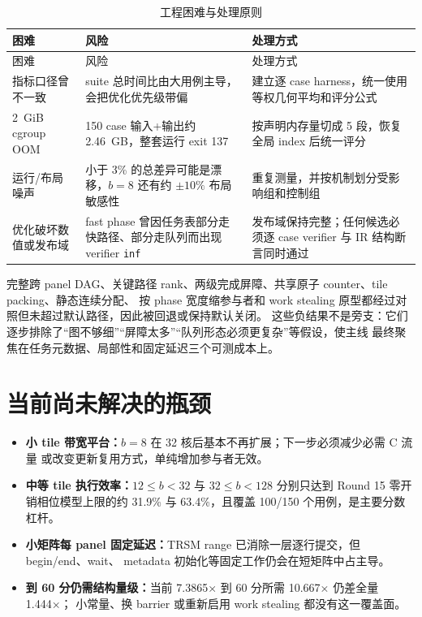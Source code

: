 \documentclass[UTF8,a4paper,openany,11pt,fontset=fandol]{ctexrep}
\begin{document}
\begin{longtable}{L{3.3cm}L{5.0cm}L{5.4cm}}
  \caption{工程困难与处理原则}\label{tab:difficulties}\\
  \toprule
  困难 & 风险 & 处理方式 \\
  \midrule
  \endfirsthead
  \toprule
  困难 & 风险 & 处理方式 \\
  \midrule
  \endhead
  指标口径曾不一致 & suite 总时间比由大用例主导，会把优化优先级带偏 &
  建立逐 case harness，统一使用等权几何平均和评分公式 \\
  2~GiB cgroup OOM & 150 case 输入+输出约 2.46~GB，整套运行 exit 137 &
  按声明内存量切成 5 段，恢复全局 index 后统一评分 \\
  运行/布局噪声 & 小于 3\% 的总差异可能是漂移，\(b=8\) 还有约 \(\pm10\%\) 布局敏感性 &
  重复测量，并按机制划分受影响组和控制组 \\
  优化破坏数值或发布域 & fast phase 曾因任务表部分走快路径、部分走队列而出现 verifier \texttt{inf} &
  发布域保持完整；任何候选必须逐 case verifier 与 IR 结构断言同时通过 \\
  \bottomrule
\end{longtable}

完整跨 panel DAG、关键路径 rank、两级完成屏障、共享原子 counter、tile packing、静态连续分配、
按 phase 宽度缩参与者和 work stealing 原型都经过对照但未超过默认路径，因此被回退或保持默认关闭。
这些负结果不是旁支：它们逐步排除了“图不够细”“屏障太多”“队列形态必须更复杂”等假设，使主线
最终聚焦在任务元数据、局部性和固定延迟三个可测成本上。

\section{当前尚未解决的瓶颈}

\begin{itemize}
  \item \textbf{小 tile 带宽平台：}\(b=8\) 在 32 核后基本不再扩展；下一步必须减少必需 C 流量
        或改变更新复用方式，单纯增加参与者无效。
  \item \textbf{中等 tile 执行效率：}\(12\le b<32\) 与 \(32\le b<128\) 分别只达到 Round 15
        零开销相位模型上限的约 31.9\% 与 63.4\%，且覆盖 100/150 个用例，是主要分数杠杆。
  \item \textbf{小矩阵每 panel 固定延迟：}TRSM range 已消除一层逐行提交，但 begin/end、wait、
        metadata 初始化等固定工作仍会在短矩阵中占主导。
  \item \textbf{到 60 分仍需结构量级：}当前 7.3865× 到 60 分所需 10.667× 仍差全量 1.444×；
        小常量、换 barrier 或重新启用 work stealing 都没有这一覆盖面。
\end{itemize}
\end{document}
